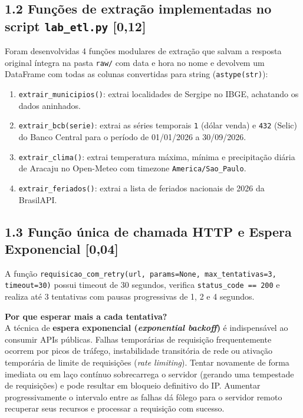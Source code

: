\documentclass[11pt,a4paper]{article}
\begin{document}
\subsection*{1.2 Funções de extração implementadas no script \texttt{lab\_etl.py} \textnormal{[0,12]}}
Foram desenvolvidas 4 funções modulares de extração que salvam a resposta original íntegra na pasta \texttt{raw/} com data e hora no nome e devolvem um DataFrame com todas as colunas convertidas para string (\texttt{astype(str)}):
\begin{enumerate}
    \item \texttt{extrair\_municipios()}: extrai localidades de Sergipe no IBGE, achatando os dados aninhados.
    \item \texttt{extrair\_bcb(serie)}: extrai as séries temporais \texttt{1} (dólar venda) e \texttt{432} (Selic) do Banco Central para o período de 01/01/2026 a 30/09/2026.
    \item \texttt{extrair\_clima()}: extrai temperatura máxima, mínima e precipitação diária de Aracaju no Open-Meteo com timezone \texttt{America/Sao\_Paulo}.
    \item \texttt{extrair\_feriados()}: extrai a lista de feriados nacionais de 2026 da BrasilAPI.
\end{enumerate}

\subsection*{1.3 Função única de chamada HTTP e Espera Exponencial \textnormal{[0,04]}}
A função \texttt{requisicao\_com\_retry(url, params=None, max\_tentativas=3, timeout=30)} possui timeout de 30 segundos, verifica \texttt{status\_code == 200} e realiza até 3 tentativas com pausas progressivas de 1, 2 e 4 segundos.

\vspace{0.2cm}
\noindent\textbf{Por que esperar mais a cada tentativa?}\\
A técnica de \textbf{espera exponencial (\textit{exponential backoff})} é indispensável ao consumir APIs públicas. Falhas temporárias de requisição frequentemente ocorrem por picos de tráfego, instabilidade transitória de rede ou ativação temporária de limite de requisições (\textit{rate limiting}). Tentar novamente de forma imediata ou em laço contínuo sobrecarrega o servidor (gerando uma tempestade de requisições) e pode resultar em bloqueio definitivo do IP. Aumentar progressivamente o intervalo entre as falhas dá fôlego para o servidor remoto recuperar seus recursos e processar a requisição com sucesso.
\end{document}
